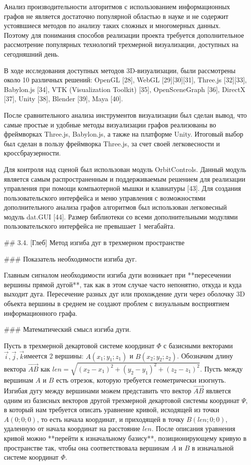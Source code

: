 Анализ производительности алгоритмов с использованием информационных графов не является достаточно популярной областью в науке и не содержит устоявшиеся методов по анализу таких сложных и многомерных данных. Поэтому для понимания способов реализации проекта требуется дополнительное рассмотрение популярных технологий трехмерной визуализации, доступных на сегодняшний день.

В ходе исследования доступных методов 3D-визуализации, были рассмотрены около 10 различных решений: OpenGL [28], WebGL [29][30][31], Three.js [32][33], Babylon.js [34], VTK (Visualization Toolkit) [35], OpenSceneGraph [36], DirectX [37], Unity [38], Blender [39], Maya [40].

После сравнительного анализа инструментов визуализации был сделан вывод, что самые простые и удобные методы визуализации графов реализованы во фреймворках Three.js, Babylon.js, а также на платформе Unity. Итоговый выбор был сделан в пользу фреймворка Three.js, за счет своей легковесности и кроссбраузерности.

Для контроля над сценой был использован модуль OrbitControls. Данный модуль является самым распространенным и поддерживаемым решением для реализации управления при помощи компьютерной мышки и клавиатуры [43]. Для создания пользовательского интерфейса и меню управления с возможностями дополнительного анализа графов алгоритмов был использован легковесный модуль dat.GUI [44]. Размер библиотеки со всеми дополнительными модулями пользовательского интерфейса не превышает 1 мегабайта.

## 3.4. [Глеб] Метод изгиба дуг в трехмерном пространстве

### Показатель необходимости изгиба дуг.

Главным сигналом необходимости изгиба дуги возникает при **пересечении вершины прямой дугой**, так как в этом случае часто непонятно, откуда и куда выходит дуга. Пересечение разных дуг или прохождение дуги через оболочку 3D объекта вершины в среднем не создают проблем с визуальным восприятием информационного графа.

### Математический смысл изгиба дуги.

Пусть в трехмерной декартовой системе координат $\Phi$ с базисными векторами $\overrightarrow{i}, \overrightarrow{j}, \overrightarrow{k}$имеется 2 вершины: $A(x_1; y_1; z_1)$ и $B(x_2; y_2; z_2)$. Обозначим длину вектора $\overrightarrow{AB}$ как  $len = \sqrt{
(x_2 - x_1)^2 +
(y_2 - y_1)^2 +
(z_2 - z_1)^2 }$. Пусть между вершинам $A$ и $B$ есть отрезок, которую требуется геометрически изогнуть. Изгибая дугу между вершинами можем представить что вектор $\overrightarrow{AB}$ является одним из базисных векторов другой трехмерной декартовой системы координат $\Psi$, в который нам требуется описать уравнение кривой, исходящей из точки $A(0; 0; 0)$, то есть начала координат, и приходящей в точку $B\left(len; 0; 0 \right)$, удаленную от начала координат на расстояние $len$. После описания уравнения кривой можно **перейти к изначальному базису**, позиционирующему кривую в пространстве так, чтобы она соответствовала вершинам $A$ и $B$ в изначальной системе координат $\Phi$. 

